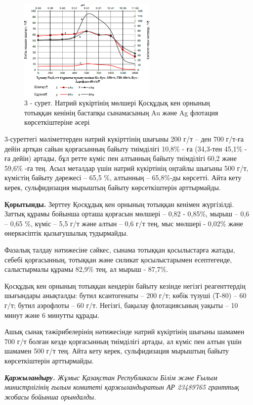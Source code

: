 \begin{figure}[H]
	\centering
	\includegraphics[width=0.6\textwidth]{media/gorn/image8}
	\caption*{3 - сурет. Натрий күкіртінің мөлшері Қосқұдық кен орнының тотыққан кенінің бастапқы сынамасының Au және Ag флотация көрсеткіштеріне әсері}
\end{figure}

\begin{multicols}{2}
3-суреттегі мәліметтерден натрий күкірттінің шығыны 200 г/т -- ден 700
г/т-ға дейін артқан сайын қорғасынның байыту тиімділігі 10,8\% - ға
(34,3-тен 45,1\% - ға дейін) артады, бұл ретте күміс пен алтынның байыту
тиімділігі 60,2 және 59,6\% -ға тең. Асыл металдар үшін натрий
күкіртінің оңтайлы шығыны 500 г/т, күмістің байыту дәрежесі -- 65,5 \%,
алтынның -- 65,8\%-ды көрсетті. Айта кету керек, сульфидизация мырыштың
байыту көрсеткіштерін арттырмайды.

{\bfseries Қорытынды.} Зерттеу Қосқұдық кен орнының тотыққан кенімен
жүргізілді. Заттық құрамы бойынша орташа қорғасын мөлшері -- 0,82 -
0,85\%, мырыш -- 0,6 -- 0,65 \%, күміс -- 5,5 г/т және алтын -- 0,6 г/т
тең, мыс мөлшері - 0,02\% және өнеркәсіптік қызығушылық тудырмайды.

Фазалық талдау нәтижесіне сәйкес, сынама тотыққан қосылыстарға жатады,
себебі қорғасынның, тотыққан және силикат қосылыстарымен есептегенде,
салыстырмалы құрамы 82,9\% тең, ал мырыш - 87,7\%.

Қосқұдық кен орнының тотыққан кендерін байыту кезінде негізгі
реагенттердің шығындары анықталды: бутил ксантогенаты -- 200 г/т; көбік
түзуші (Т-80) -- 60 г/т; бутил аэрофлоты -- 60 г/т. Негізгі, бақылау
флотациясының уақыты -- 10 минут және 6 минутты құрады.

Ашық сынақ тәжірибелерінің нәтижесінде натрий күкіртінің шығыны шамамен
700 г/т болған кезде қорғасынның тиімділігі артады, ал күміс пен алтын
үшін шамамен 500 г/т тең. Айта кету керек, сульфидизация мырыштың байыту
көрсеткіштерін арттырмайды.

\emph{{\bfseries Қаржыландыру.} Жұмыс Қазақстан Республикасы Білім және
Ғылым министрлігінің ғылым комитеті қаржыландыратын АР 23489765 гранттық
жобасы бойынша орындалды.}
\end{multicols}

